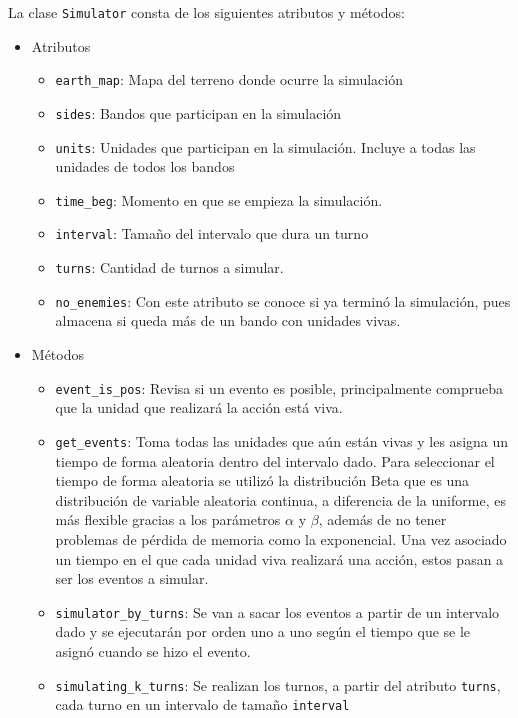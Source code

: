 La clase \verb|Simulator| consta de los siguientes atributos y m\'etodos:

\begin{itemize}

\item Atributos
 \begin{itemize}
 \item \verb|earth_map|: Mapa del terreno donde ocurre la simulaci\'on
 
 \item \verb|sides|: Bandos que participan en la simulaci\'on
 
 \item \verb|units|: Unidades que participan en la simulación. Incluye a todas las unidades de todos los bandos
 
 \item \verb|time_beg|: Momento en que se empieza la simulaci\'on.
 
 \item \verb|interval|: Tama\~no del intervalo que dura un turno
 
 \item \verb|turns|: Cantidad de turnos a simular.
 
 \item \verb|no_enemies|: Con este atributo se conoce si ya terminó la simulaci\'on, pues almacena si queda m\'as de un bando con unidades vivas.
 
 \end{itemize}
 \item M\'etodos
 
 \begin{itemize}
 \item \verb|event_is_pos|: Revisa si un evento es posible, principalmente comprueba que la unidad que realizar\'a la acci\'on est\'a viva.
 
 \item \verb|get_events|: Toma todas las unidades que a\'un est\'an vivas y les asigna un tiempo de forma aleatoria dentro del intervalo dado. Para seleccionar el tiempo de forma aleatoria se utiliz\'o la distribuci\'on Beta que es una distribución de variable aleatoria continua, a diferencia de la uniforme, es  m\'as flexible gracias a los par\'ametros $ \alpha $ y $ \beta $, adem\'as de no tener problemas de p\'erdida de memoria como la exponencial. Una vez asociado un tiempo en el que cada unidad viva realizar\'a una acci\'on, estos pasan a ser los eventos a simular.
 
 \item \verb|simulator_by_turns|: Se van a sacar los eventos a partir de un intervalo dado y se ejecutar\'an por orden uno a uno seg\'un el tiempo que se le asign\'o cuando se hizo el evento.
 
 
 \item \verb|simulating_k_turns|: Se realizan los turnos, a partir del atributo \verb|turns|, cada turno en un intervalo de tama\~no \verb|interval|
 \end{itemize}
 
\end{itemize}


